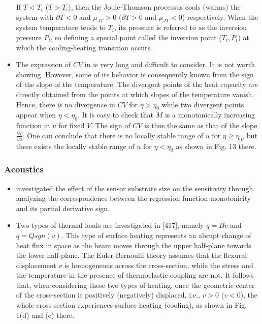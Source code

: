 \documentclass[11pt]{book}
\begin{document}
\begin{itemize}
If $T<T_{i}$ ($T>T_{i}$), then the Joule-Thomson processus cools
(warms) the system with $\partial T<0$ and $\mu_{JT}>0$ ($\partial T>0$
and $\mu_{JT}<0$) respectively. When the system temperature tends
to $T_{i}$, its pressure is referred to as the inversion pressure
$P_{i}$, so defining a special point called the inversion point ($T_{i},P_{i}$)
at which the cooling-heating transition occurs.
\item The expression of $CV$ in \cite{nakarachinda2021effective}
is very long and difficult to consider. It is not worth showing. However,
some of its behavior is consequently known from the sign of the slope
of the temperature. The divergent points of the heat capacity are
directly obtained from the points at which slopes of the temperature
vanish. Hence, there is no divergence in $CV$ for $\eta>\eta_{0}$
while two divergent points appear when $\eta<\eta_{0}$. It is easy
to check that $M$ is a monotonically increasing function in $u$
for fixed $V$. The sign of $CV$ is thus the same as that of the
slope $\frac{\partial T}{\partial u}$. One can conclude that there
is no locally stable range of $u$ for $\eta\geq\eta_{0}$, but there
exists the locally stable range of $u$ for $\eta<\eta_{0}$ as shown
in Fig. 13 there.
\end{itemize}
\subsubsection{Acoustics}
\begin{itemize}
\item \cite{lei2014novel}
investigated the effect of the sensor substrate size on the sensitivity
through analyzing the correspondence between the regression function
monotonicity and its partial derivative sign.
\item Two types of thermal loads are investigated in {[}417{]}, namely $q=Bv$
and $q=Qsgn\left(v\right)$. This type of surface heating represents
an abrupt change of heat flux in space as the beam moves through the
upper half-plane towards the lower half-plane. The Euler-Bernoulli
theory assumes that the flexural displacement $v$ is homogeneous
across the cross-section, while the stress and the temperature in
the presence of thermoelastic coupling are not. It follows that, when
considering these two types of heating, once the geometric center
of the cross-section is positively (negatively) displaced, i.e., $v>0$
($v<0$), the whole cross-section experiences surface heating (cooling),
as shown in Fig. 1(d) and (e) there.
\end{itemize}
\end{document}

